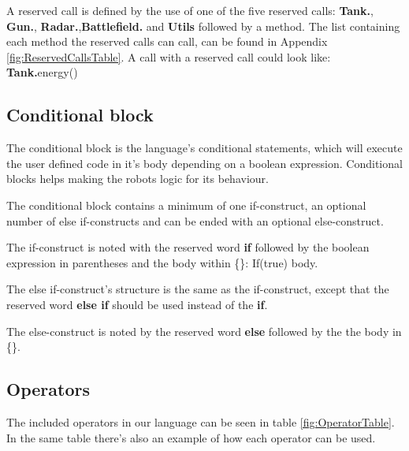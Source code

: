 \begin{defi}
A reserved call is defined by the use of one of the five reserved calls: \textbf{Tank.}, \textbf{Gun.}, \textbf{Radar.},\textbf{Battlefield.} and \textbf{Utils} followed by a method. The list containing each method the reserved calls can call, can be found in Appendix \ref{fig:ReservedCallsTable}. \newline
A call with a reserved call could look like: \textbf{Tank.}energy()
\end{defi}

\subsection{Conditional block}
The conditional block is the language's conditional statements, which will execute the user defined code in it's body depending on a boolean expression. Conditional blocks helps making the robots logic for its behaviour. 

\begin{defi}
The conditional block contains a minimum of one if-construct, an optional number of else if-constructs and can be ended with an optional else-construct. 

The if-construct is noted with the reserved word \textbf{if} followed by the boolean expression in parentheses and the body within \{\}: If(true) {body}.

The else if-construct's structure is the same as the if-construct, except that the reserved  word \textbf{else if} should be used instead of the \textbf{if}. 

The else-construct is noted by the reserved word \textbf{else} followed by the the body in \{\}.
\end{defi}

\subsection{Operators}
The included operators in our language can be seen in table \ref{fig:OperatorTable}. In the same table there's also an example of how each operator can be used.

